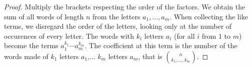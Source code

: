 

\setcounter{section}{4}
\setcounter{subsection}{2}
\setcounter{dfn}{2}

\begin{proof}
Multiply the brackets respecting the order of the factors.
We obtain the sum of all words of length $n$ from the letters $a_1, \ldots, a_m$.
When collecting the like terms, we disregard the order of the letters, looking only at the number of occurences of every letter.
The words with $k_i$ letters $a_i$ (for all $i$ from $1$ to $m$) become the terms $a_1^{k_1} \cdots a_m^{k_m}$.
The coefficient at this term is the number of the words made of $k_1$ letters $a_1$,... $k_m$ letters $a_m$,
that is $\binom{n}{k_1, \ldots, k_m}$.
\end{proof}




